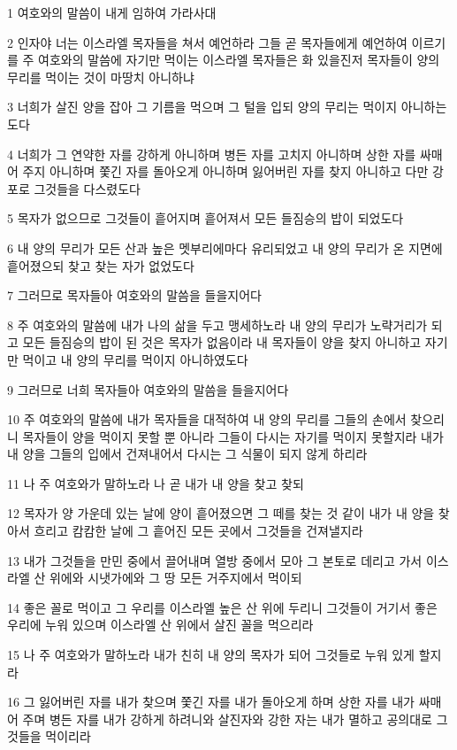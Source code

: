 \par 1 여호와의 말씀이 내게 임하여 가라사대
\par 2 인자야 너는 이스라엘 목자들을 쳐서 예언하라 그들 곧 목자들에게 예언하여 이르기를 주 여호와의 말씀에 자기만 먹이는 이스라엘 목자들은 화 있을진저 목자들이 양의 무리를 먹이는 것이 마땅치 아니하냐
\par 3 너희가 살진 양을 잡아 그 기름을 먹으며 그 털을 입되 양의 무리는 먹이지 아니하는도다
\par 4 너희가 그 연약한 자를 강하게 아니하며 병든 자를 고치지 아니하며 상한 자를 싸매어 주지 아니하며 쫓긴 자를 돌아오게 아니하며 잃어버린 자를 찾지 아니하고 다만 강포로 그것들을 다스렸도다
\par 5 목자가 없으므로 그것들이 흩어지며 흩어져서 모든 들짐승의 밥이 되었도다
\par 6 내 양의 무리가 모든 산과 높은 멧부리에마다 유리되었고 내 양의 무리가 온 지면에 흩어졌으되 찾고 찾는 자가 없었도다
\par 7 그러므로 목자들아 여호와의 말씀을 들을지어다
\par 8 주 여호와의 말씀에 내가 나의 삶을 두고 맹세하노라 내 양의 무리가 노략거리가 되고 모든 들짐승의 밥이 된 것은 목자가 없음이라 내 목자들이 양을 찾지 아니하고 자기만 먹이고 내 양의 무리를 먹이지 아니하였도다
\par 9 그러므로 너희 목자들아 여호와의 말씀을 들을지어다
\par 10 주 여호와의 말씀에 내가 목자들을 대적하여 내 양의 무리를 그들의 손에서 찾으리니 목자들이 양을 먹이지 못할 뿐 아니라 그들이 다시는 자기를 먹이지 못할지라 내가 내 양을 그들의 입에서 건져내어서 다시는 그 식물이 되지 않게 하리라
\par 11 나 주 여호와가 말하노라 나 곧 내가 내 양을 찾고 찾되
\par 12 목자가 양 가운데 있는 날에 양이 흩어졌으면 그 떼를 찾는 것 같이 내가 내 양을 찾아서 흐리고 캄캄한 날에 그 흩어진 모든 곳에서 그것들을 건져낼지라
\par 13 내가 그것들을 만민 중에서 끌어내며 열방 중에서 모아 그 본토로 데리고 가서 이스라엘 산 위에와 시냇가에와 그 땅 모든 거주지에서 먹이되
\par 14 좋은 꼴로 먹이고 그 우리를 이스라엘 높은 산 위에 두리니 그것들이 거기서 좋은 우리에 누워 있으며 이스라엘 산 위에서 살진 꼴을 먹으리라
\par 15 나 주 여호와가 말하노라 내가 친히 내 양의 목자가 되어 그것들로 누워 있게 할지라
\par 16 그 잃어버린 자를 내가 찾으며 쫓긴 자를 내가 돌아오게 하며 상한 자를 내가 싸매어 주며 병든 자를 내가 강하게 하려니와 살진자와 강한 자는 내가 멸하고 공의대로 그것들을 먹이리라
